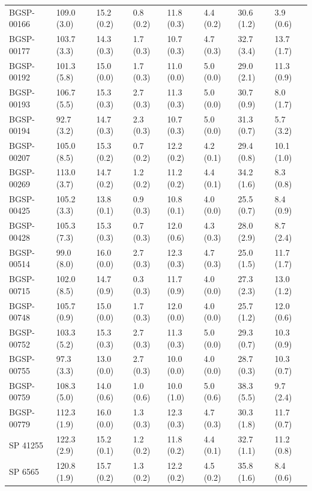 \documentclass[12pt,oneside]{reedthesis}
\begin{document}
\begin{table}[!h]
{\begin{tabular}[t]{llllllll}
BGSP-00166 & 109.0 (3.0) & 15.2 (0.2) & 0.8 (0.2) & 11.8 (0.3) & 4.4 (0.2) & 30.6 (1.2) & 3.9 (0.6)\\
\addlinespace
BGSP-00177 & 103.7 (3.3) & 14.3 (0.3) & 1.7 (0.3) & 10.7 (0.3) & 4.7 (0.3) & 32.7 (3.4) & 13.7 (1.7)\\
BGSP-00192 & 101.3 (5.8) & 15.0 (0.0) & 1.7 (0.3) & 11.0 (0.0) & 5.0 (0.0) & 29.0 (2.1) & 11.3 (0.9)\\
BGSP-00193 & 106.7 (5.5) & 15.3 (0.3) & 2.7 (0.3) & 11.3 (0.3) & 5.0 (0.0) & 30.7 (0.9) & 8.0 (1.7)\\
BGSP-00194 & 92.7 (3.2) & 14.7 (0.3) & 2.3 (0.3) & 10.7 (0.3) & 5.0 (0.0) & 31.3 (0.7) & 5.7 (3.2)\\
BGSP-00207 & 105.0 (8.5) & 15.3 (0.2) & 0.7 (0.2) & 12.2 (0.2) & 4.2 (0.1) & 29.4 (0.8) & 10.1 (1.0)\\
\addlinespace
BGSP-00269 & 113.0 (3.7) & 14.7 (0.2) & 1.2 (0.2) & 11.2 (0.2) & 4.4 (0.1) & 34.2 (1.6) & 8.3 (0.8)\\
BGSP-00425 & 105.2 (3.3) & 13.8 (0.1) & 0.9 (0.3) & 10.8 (0.1) & 4.0 (0.0) & 25.5 (0.7) & 8.4 (0.9)\\
BGSP-00428 & 105.3 (7.3) & 15.3 (0.3) & 0.7 (0.3) & 12.0 (0.6) & 4.3 (0.3) & 28.0 (2.9) & 8.7 (2.4)\\
BGSP-00514 & 99.0 (8.0) & 16.0 (0.0) & 2.7 (0.3) & 12.3 (0.3) & 4.7 (0.3) & 25.0 (1.5) & 11.7 (1.7)\\
BGSP-00715 & 102.0 (8.5) & 14.7 (0.9) & 0.3 (0.3) & 11.7 (0.9) & 4.0 (0.0) & 27.3 (2.3) & 13.0 (1.2)\\
\addlinespace
BGSP-00748 & 105.7 (0.9) & 15.0 (0.0) & 1.7 (0.3) & 12.0 (0.0) & 4.0 (0.0) & 25.7 (1.2) & 12.0 (0.6)\\
BGSP-00752 & 103.3 (5.2) & 15.3 (0.3) & 2.7 (0.3) & 11.3 (0.3) & 5.0 (0.0) & 29.3 (0.7) & 10.3 (0.9)\\
BGSP-00755 & 97.3 (3.3) & 13.0 (0.0) & 2.7 (0.3) & 10.0 (0.0) & 4.0 (0.0) & 28.7 (0.3) & 10.3 (0.7)\\
BGSP-00759 & 108.3 (5.0) & 14.0 (0.6) & 1.0 (0.6) & 10.0 (1.0) & 5.0 (0.6) & 38.3 (5.5) & 9.7 (2.4)\\
BGSP-00779 & 112.3 (1.9) & 16.0 (0.0) & 1.3 (0.3) & 12.3 (0.3) & 4.7 (0.3) & 30.3 (1.8) & 11.7 (0.7)\\
\addlinespace
SP 41255 & 122.3 (2.9) & 15.2 (0.1) & 1.2 (0.2) & 11.8 (0.2) & 4.4 (0.1) & 32.7 (1.1) & 11.2 (0.8)\\
SP 6565 & 120.8 (1.9) & 15.7 (0.2) & 1.3 (0.2) & 12.2 (0.2) & 4.5 (0.2) & 35.8 (1.6) & 8.4 (0.6)\\

\end{tabular}}
\end{table}
\end{document}
